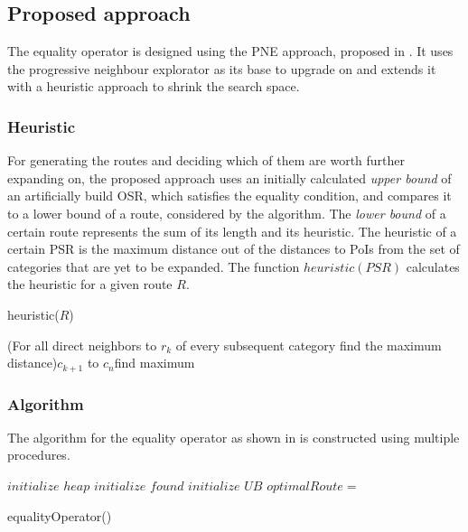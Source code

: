 \subsection{Proposed approach} 
\label{sec:approachEO}
The equality operator is designed using the PNE approach, proposed in \cite{OSR}. It uses the progressive neighbour explorator as its base to upgrade on and extends it with a heuristic approach to shrink the search space.

\subsubsection{Heuristic}
For generating the routes and deciding which of them are worth further expanding on, the proposed approach uses an initially calculated \textit{upper bound} of an artificially build OSR, which satisfies the equality condition, and compares it to a lower bound of a route, considered by the algorithm. The \textit{lower bound} of a certain route represents the sum of its length and its heuristic. The heuristic of a certain PSR is the maximum distance out of the distances to PoIs from the set of categories that are yet to be expanded. The function $heuristic(PSR)$  calculates the heuristic for a given route $R$.

\begin{function}[htb!]
	\label{proc:heuristic}
	\caption{heuristic($R$)}
	\For(For all direct neighbors to $r_k$ of every subsequent category find the maximum distance){$c_{k+1}$ to $c_n$}{find maximum\;}
\end{function}

\subsubsection{Algorithm}

The algorithm for the equality operator as shown in  is constructed using multiple procedures.

\begin{algorithm}[htb!]
	
	
	
	
	\BlankLine
	
	$initialize$ $heap$ 
	$initialize$ $found$ 
	$initialize$ $UB$\; 
	$optimalRoute =$\;
	{
		\dummySR{}\;
		\modifiedPNE{}\;
	}
\caption{equalityOperator()}
\label{alg:equality}
\end{algorithm}

